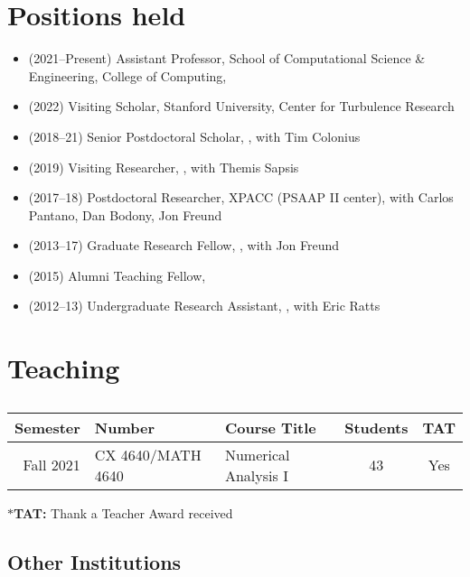 \section{Positions held}

\begin{itemize}
    \item (2021--Present) Assistant Professor, School of Computational Science \& Engineering, College of Computing, \GIT
    \item (2022) Visiting Scholar, Stanford University, Center for Turbulence Research
    \item (2018--21) Senior Postdoctoral Scholar, \CIT, with Tim Colonius
    \item (2019) Visiting Researcher, \MIT, with Themis Sapsis
    \item (2017--18) Postdoctoral Researcher, XPACC (PSAAP II center), with Carlos Pantano, Dan Bodony, Jon Freund
    \item (2013--17) Graduate Research Fellow, \UIUC, with Jon Freund
    \item (2015) Alumni Teaching Fellow, \UIUC
    \item (2012--13) Undergraduate Research Assistant, \UMD, with Eric Ratts
\end{itemize}

\section{Teaching}

\subsection{\GIT}

\begin{center}
    \begin{tabular}{ r l l c c }
        \hline
        \bf Semester  &\bf Number & \bf Course Title & \bf Students & \bf TAT \\
        \hline
        Fall 2021 & CX 4640/MATH 4640 & Numerical Analysis I & 43 & Yes \\
        \hline\hline
    \end{tabular}
\end{center}
$\ast$\textbf{TAT:} Thank a Teacher Award received

\subsection{Other Institutions}

